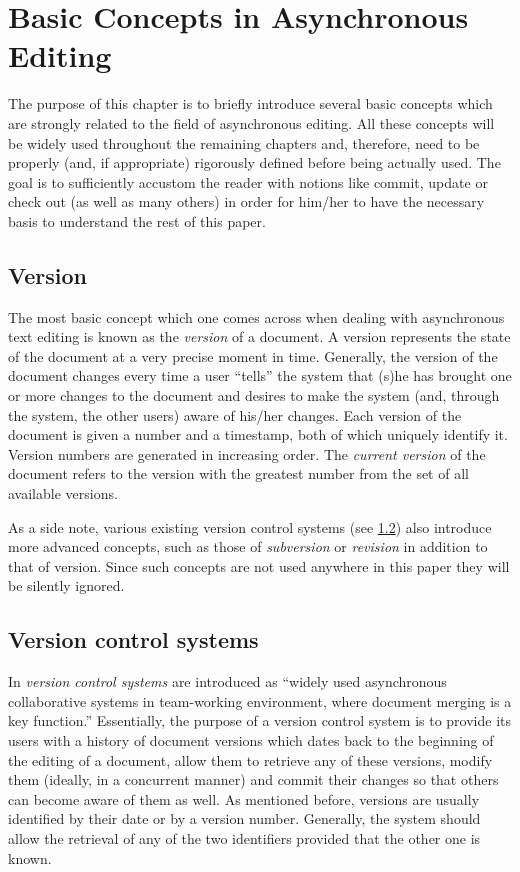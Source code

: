 \chapter{Basic Concepts in  Asynchronous Editing}
\label{chap:concepts}

The purpose of this chapter is to briefly introduce several basic concepts which are
strongly related to the field of asynchronous editing. All these concepts will be widely
used throughout the remaining chapters and, therefore, need to be properly (and, if
appropriate) rigorously defined before being actually used. The goal is to sufficiently
accustom the reader with notions like commit, update or check out (as well as many others)
in order for him/her to have the necessary basis to understand the rest of this paper.

\section{Version}

The most basic concept which one comes across when dealing with asynchronous text
editing is known as the \emph{version} of a document. A version represents
the state of the document at a very precise moment in time. Generally, the version
of the document changes every time a user ``tells'' the system that (s)he has brought
one or more changes to the document and desires to make the system (and, through the
system, the other users) aware of his/her changes. Each version of the document is
given a number and a timestamp, both of which uniquely identify it. Version numbers
are generated in increasing order. The \emph{current version} of the document refers
to the version with the greatest number from the set of all available versions.

As a side note, various existing version control systems (see \ref{sec:vcs}) also
introduce more advanced concepts, such as those of \emph{subversion} or \emph{revision}
in addition to that of version. Since such concepts are not used anywhere in this
paper they will be silently ignored.

\section{Version control systems}
\label{sec:vcs}

In \cite{shen02} \emph{version control systems} are introduced as ``widely used
asynchronous collaborative systems in team-working environment, where document
merging is a key function.'' Essentially, the purpose of a version control system
is to provide its users with a history of document versions which dates back to
the beginning of the editing of a document, allow them to retrieve any of these
versions, modify them (ideally, in a concurrent manner) and commit their changes
so that others can become aware of them as well. As mentioned before, versions are usually
identified by their date or by a version number. Generally, the system should allow
the retrieval of any of the two identifiers provided that the other one is known.

